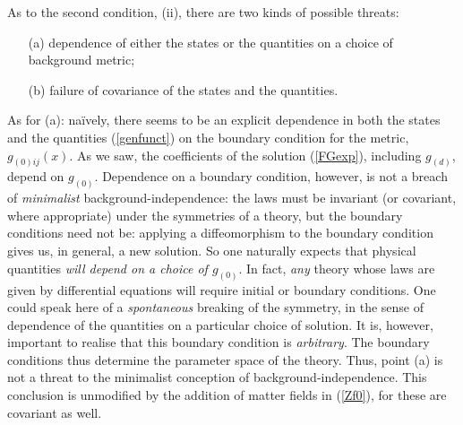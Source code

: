\documentclass[12pt]{article}
\renewcommand{\^}[1]{\hat{#1}}
\newcommand{\eq}[1]{(\ref{#1})}
\begin{document}
As to the second condition, (ii), there are two kinds of possible threats:
\begin{itemize}
\item[(a)]dependence of either the states or the quantities on a choice of background metric;
\item[(b)] failure of covariance of the states and the quantities.
\end{itemize}
As for (a): na\"ively, there seems to be an explicit dependence in both the states and the quantities \eq{genfunct} on the boundary condition for the metric, $g_{(0)ij}(x)$. As we saw, the coefficients of the solution \eq{FGexp}, including $g_{(d)}$, depend on $g_{(0)}$. Dependence on a boundary condition, however, is not a breach of {\it minimalist} background-independence: the laws must be invariant (or covariant, where appropriate)  under the symmetries of a theory, but the boundary conditions need not be: applying a diffeomorphism to the boundary condition gives us, in general, a new solution. So one naturally expects that physical quantities {\it will depend on a choice of $g_{(0)}$}. In fact, {\it any} theory whose laws are given by differential equations will require initial or boundary conditions. 
One could speak here of a {\it spontaneous} breaking of the symmetry, in the sense of dependence of the quantities on a particular choice of solution. It is, however, important to realise that this boundary condition is {\it arbitrary}. The boundary conditions thus determine the parameter space of the theory. Thus, point (a) is not a threat to the minimalist conception of background-independence.
This conclusion is unmodified by the addition of matter fields in \eq{Zf0}, for these are covariant as well.
\end{document}
